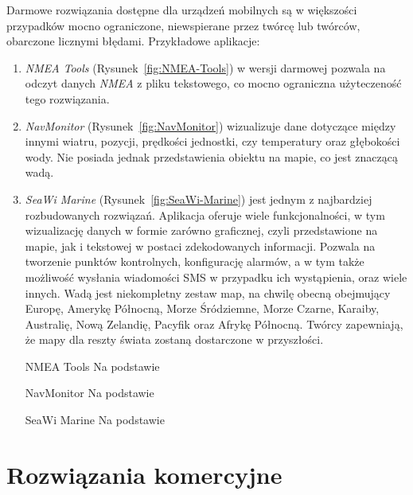 \documentclass[skorowidz,skroty]{dyplomWEZUT}
\begin{document}
Darmowe rozwiązania dostępne dla urządzeń mobilnych są w większości przypadków mocno ograniczone, niewspierane przez twórcę lub twórców, obarczone licznymi błędami. Przykładowe aplikacje:
\begin{enumerate}

\item \textit{NMEA Tools} \cite{NMEATools} (Rysunek~\ref{fig:NMEA-Tools}) w wersji darmowej pozwala na odczyt danych \textit{NMEA} z pliku tekstowego, co mocno ograniczna użyteczeność tego rozwiązania. 

\item \textit{NavMonitor} \cite{NavMonitor} (Rysunek~\ref{fig:NavMonitor}) wizualizuje dane dotyczące między innymi wiatru, pozycji, prędkości jednostki, czy temperatury oraz głębokości wody. Nie posiada jednak przedstawienia obiektu na mapie, co jest znaczącą wadą. 

\item \textit{SeaWi Marine} \cite{SeaWiMarine} (Rysunek~\ref{fig:SeaWi-Marine}) jest jednym z najbardziej rozbudowanych rozwiązań. Aplikacja oferuje wiele funkcjonalności, w tym wizualizację danych w formie zarówno graficznej, czyli przedstawione na mapie, jak i tekstowej w postaci zdekodowanych informacji. Pozwala na tworzenie punktów kontrolnych, konfigurację alarmów, a w tym także możliwość wysłania wiadomości SMS w przypadku ich wystąpienia, oraz wiele innych. Wadą jest niekompletny zestaw map, na chwilę obecną obejmujący Europę, Amerykę Północną, Morze Śródziemne, Morze Czarne, Karaiby, Australię, Nową Zelandię, Pacyfik oraz Afrykę Północną. Twórcy zapewniają, że mapy dla reszty świata zostaną dostarczone w przyszłości.

{NMEA Tools \label{fig:NMEA-Tools}}
{Na podstawie \cite{NMEATools}}

{NavMonitor \label{fig:NavMonitor}}
{Na podstawie \cite{NavMonitor}}

{SeaWi Marine \label{fig:SeaWi-Marine}}
{Na podstawie \cite{SeaWiMarine}}

\end{enumerate}
\newpage
\section{Rozwiązania komercyjne}\label{chap: Commercial solutions}
\end{document}
